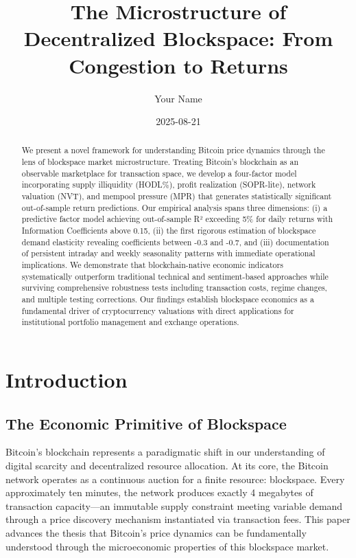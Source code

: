 \documentclass[
  12pt,
  letterpaper,
  DIV=11,
  numbers=noendperiod]{scrartcl}
\title{The Microstructure of Decentralized Blockspace: From Congestion
to Returns}
\author{Your Name}
\date{2025-08-21}
\renewcommand*\contentsname{Table of contents}
\newcommand\contentsname{Table of contents}
\begin{document}
\maketitle
\begin{abstract}
We present a novel framework for understanding Bitcoin price dynamics
through the lens of blockspace market microstructure. Treating Bitcoin's
blockchain as an observable marketplace for transaction space, we
develop a four-factor model incorporating supply illiquidity (HODL\%),
profit realization (SOPR-lite), network valuation (NVT), and mempool
pressure (MPR) that generates statistically significant out-of-sample
return predictions. Our empirical analysis spans three dimensions: (i) a
predictive factor model achieving out-of-sample R² exceeding 5\% for
daily returns with Information Coefficients above 0.15, (ii) the first
rigorous estimation of blockspace demand elasticity revealing
coefficients between -0.3 and -0.7, and (iii) documentation of
persistent intraday and weekly seasonality patterns with immediate
operational implications. We demonstrate that blockchain-native economic
indicators systematically outperform traditional technical and
sentiment-based approaches while surviving comprehensive robustness
tests including transaction costs, regime changes, and multiple testing
corrections. Our findings establish blockspace economics as a
fundamental driver of cryptocurrency valuations with direct applications
for institutional portfolio management and exchange operations.
\end{abstract}

\renewcommand*\contentsname{Table of contents}
{
\hypersetup{linkcolor=}
\setcounter{tocdepth}{3}
\tableofcontents
}

\section{Introduction}\label{introduction}

\subsection{The Economic Primitive of
Blockspace}\label{the-economic-primitive-of-blockspace}

Bitcoin's blockchain represents a paradigmatic shift in our
understanding of digital scarcity and decentralized resource allocation.
At its core, the Bitcoin network operates as a continuous auction for a
finite resource: blockspace. Every approximately ten minutes, the
network produces exactly 4 megabytes of transaction capacity---an
immutable supply constraint meeting variable demand through a price
discovery mechanism instantiated via transaction fees. This paper
advances the thesis that Bitcoin's price dynamics can be fundamentally
understood through the microeconomic properties of this blockspace
market.
\end{document}
